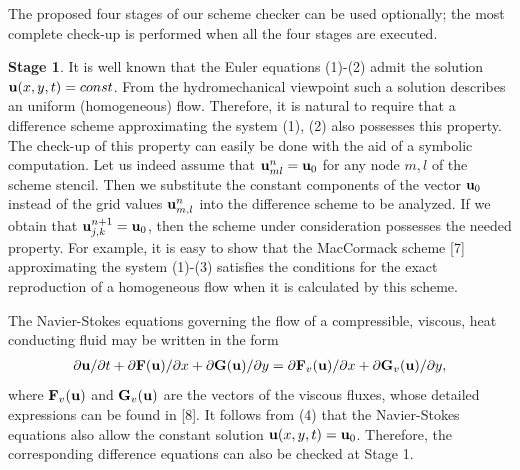    The proposed four stages of our scheme checker can be used optionally; the
most complete check-up is performed when all the four stages are executed.

{\bf Stage 1}. It is well known that the Euler equations (1)-(2) admit
the solution
${\bf u}(x, y, t)=const$. From the hydromechanical viewpoint such
a solution describes an uniform (homogeneous) flow. Therefore, it is natural
to require that a difference scheme approximating the system (1), (2) also
possesses this property. The check-up of this property can easily be done with
the aid of a symbolic computation. Let us indeed assume that
${\bf u}_{ml}^{n}={\bf u}_{0}$ for any node $m,l$ of the scheme stencil.
Then we substitute the constant components of the vector ${\bf u}_0$
instead of the grid values ${\bf u}_{m,l}^n$ into the difference scheme to be
analyzed. If we obtain that ${\bf u}_{j,k}^{n+1} = {\bf u}_0$, then the scheme
under consideration possesses the needed property. For example, it is  easy to
show that the MacCormack scheme [7] approximating the system (1)-(3)
satisfies the conditions for the exact reproduction of a
homogeneous flow when it is calculated  by this scheme.

   The Navier-Stokes equations governing the flow of a compressible, viscous,
heat conducting fluid may be written in the form
\begin{eqnarray}
\partial{\bf u}/\partial t + \partial {\bf F}({\bf u})/\partial x+
\partial {\bf G}({\bf u})/\partial y=
\partial {\bf F}_v({\bf u})/\partial x+
\partial {\bf G}_v({\bf u})/\partial y,
\end{eqnarray}
where ${\bf F}_v({\bf u})$ and ${\bf G}_v({\bf u})$ are the vectors of the
viscous fluxes, whose detailed expressions can be found in [8].
It follows from (4) that the Navier-Stokes equations also allow
the constant solution ${\bf u}(x,y,t)= {\bf u}_0$. Therefore, the
corresponding difference equations can also be checked at Stage 1.

